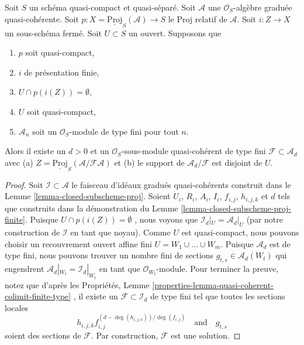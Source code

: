 \begin{lemma}
\label{lemma-closed-subscheme-proj-finite-type}
Soit  $S$  un schéma quasi-compact et quasi-séparé. Soit  $\mathcal{A}$  une
 $\mathcal{O}_S$-algèbre graduée quasi-cohérente. Soit  $p : X = \underline{\text{Proj}}_S(\mathcal{A}) \to S$  le Proj relatif de
 $\mathcal{A}$. Soit  $i : Z \to X$  un sous-schéma fermé. Soit  $U \subset S$  un ouvert.
Supposons que
\begin{enumerate}
\item $p$  soit quasi-compact,
\item $i$  de présentation finie,
\item $U \cap p(i(Z)) = \emptyset$,
\item $U$  soit quasi-compact,
\item $\mathcal{A}_n$  soit un  $\mathcal{O}_S$-module de type fini pour tout  $n$.
\end{enumerate}
Alors il existe un  $d > 0$  et un  $\mathcal{O}_S$-sous-module quasi-cohérent de
type fini  $\mathcal{F} \subset \mathcal{A}_d$  avec (a)  $Z = \underline{\text{Proj}}_S(\mathcal{A}/\mathcal{F}\mathcal{A})$  et (b) le support de  $\mathcal{A}_d/\mathcal{F}$  est
disjoint de  $U$.
\end{lemma}

\begin{proof}
Soit  $\mathcal{I} \subset \mathcal{A}$  le faisceau d'idéaux gradués quasi-cohérents construit dans le
Lemme  \ref{lemma-closed-subscheme-proj}. Soient  $U_i$,  $R_i$,  $A_i$,  $I_i$,
 $f_{i, j}$,  $h_{i, j, k}$ et  $d$  tels que construits dans la
démonstration du Lemme  \ref{lemma-closed-subscheme-proj-finite}. Puisque  $U \cap p(i(Z)) = \emptyset$ , nous voyons que
 $\mathcal{I}_d|_U = \mathcal{A}_d|_U$  (par notre construction de  $\mathcal{I}$  en tant que noyau). Comme
 $U$  est quasi-compact, nous pouvons choisir un recouvrement ouvert affine
fini  $U = W_1 \cup \ldots \cup W_m$. Puisque  $\mathcal{A}_d$  est de type fini, nous pouvons trouver un
nombre fini de sections  $g_{t, s} \in \mathcal{A}_d(W_t)$  qui engendrent  $\mathcal{A}_d|_{W_t} = \mathcal{I}_d|_{W_t}$  en tant que
 $\mathcal{O}_{W_t}$-module. Pour terminer la preuve, notez que d'après les Propriétés,
Lemme  \ref{properties-lemma-quasi-coherent-colimit-finite-type} , il existe un  $\mathcal{F} \subset \mathcal{I}_d$  de type fini tel que toutes les
sections locales
$$
h_{i, j, k}f_{i, j}^{(d - \deg(h_{i, j, k}))/\deg(f_{i, j})}
\quad\text{and}\quad
g_{t, s}
$$
soient des sections de  $\mathcal{F}$. Par construction,  $\mathcal{F}$  est une
solution.
\end{proof}

